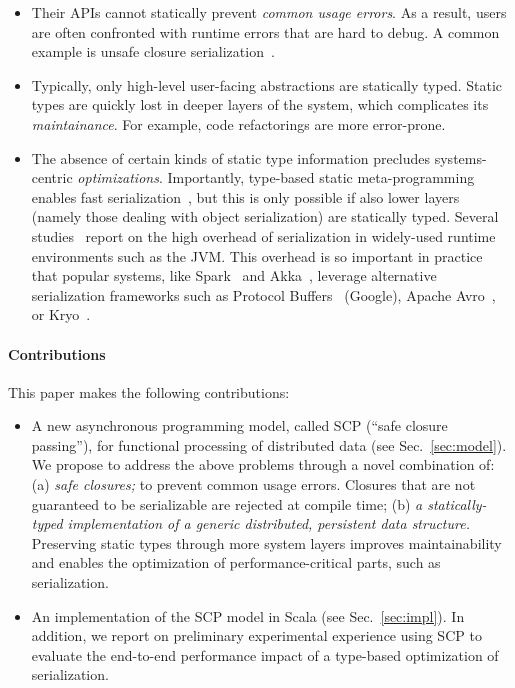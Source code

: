 \documentclass{easychair}
\begin{document}
\begin{itemize}

\item Their APIs cannot statically prevent \emph{common usage errors}. As a result, users are often
      confronted with runtime errors that are hard to debug. A common example is
      unsafe closure serialization~\cite{MillerHO14}.

\item Typically, only high-level user-facing abstractions are statically
      typed. Static types are quickly lost in deeper layers of the system,
      which complicates its \emph{maintainance}. For example, code refactorings
      are more error-prone.


\item The absence of certain kinds of static type information precludes systems-centric \emph{optimizations}.
      Importantly, type-based static meta-programming enables fast serialization~\cite{MillerHBO13}, but this is
      only possible if also lower layers (namely those dealing with object serialization) are statically typed.
      Several studies~\cite{Carpenter1999,Maassen1999,Philippsen2000,Welsh2000} report on the high
      overhead of serialization in widely-used runtime environments such as the JVM. This overhead is so
      important in practice that popular systems, like Spark~\cite{Zaharia2012} and Akka~\cite{Akka},
      leverage alternative serialization frameworks such as Protocol Buffers~\cite{Protobuf} (Google),
      Apache Avro~\cite{Avro}, or Kryo~\cite{Kryo}.

\end{itemize}

\paragraph{Contributions}

This paper makes the following contributions:
\begin{itemize}

\item A new asynchronous programming model, called SCP (``safe closure passing''), for
      functional processing of distributed data (see Sec.~\ref{sec:model}). We propose to
      address the above problems through a novel combination of: (a) \emph{safe closures;}
      to prevent common usage errors. Closures that are not guaranteed to be serializable
      are rejected at compile time; (b) \emph{a statically-typed implementation of a generic
      distributed, persistent data structure.} Preserving static types through more system
      layers improves maintainability and enables the optimization of performance-critical
      parts, such as serialization.

\item An implementation of the SCP model in Scala (see Sec.~\ref{sec:impl}). In addition,
      we report on preliminary experimental experience using SCP to evaluate the end-to-end
      performance impact of a type-based optimization of serialization.

\end{itemize}
\end{document}
